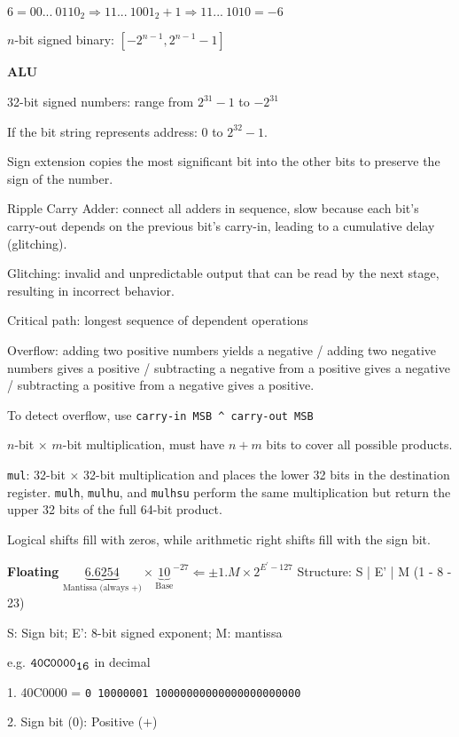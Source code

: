 \documentclass[10pt,landscape,a4paper]{article}
\begin{document}
\begin{multicols}{3}
\(6 = 00...\ 0110_2 \Rightarrow 11...\ 1001_2 + 1 \Rightarrow 11 ...\ 1010 = -6\)

\(n\)-bit signed binary: \([-2^{n-1}, 2^{n-1} - 1]\)

\textbf{ALU}

32-bit signed numbers: range from \(2^{31} - 1\) to \(-2^{31}\)

If the bit string represents address: 0 to \(2^{32} - 1\).

Sign extension copies the most significant bit into the other bits to preserve the sign of the number.

Ripple Carry Adder: connect all adders in sequence, slow because each bit's carry-out depends on the previous bit's carry-in, leading to a cumulative delay (glitching).

Glitching: invalid and unpredictable output that can be read by the next stage, resulting in incorrect behavior.

Critical path: longest sequence of dependent operations

Overflow: adding two positive numbers yields a negative / adding two negative numbers gives a positive / subtracting a negative from a positive gives a negative / subtracting a positive from a negative gives a positive.

To detect overflow, use \verb|carry-in MSB ^ carry-out MSB|

\(n\)-bit \(\times\) \(m\)-bit multiplication, must have \(n + m\) bits to cover all possible products.

\verb|mul|: 32-bit \(\times\) 32-bit multiplication and places the lower 32 bits in the destination register. \verb|mulh|, \verb|mulhu|, and \verb|mulhsu| perform the same multiplication but return the upper 32 bits of the full 64-bit product.

Logical shifts fill with zeros, while arithmetic right shifts fill with the sign bit.

\textbf{Floating}
\(
  \underbrace{6.6254}_{\text{Mantissa (always +)}} \times {\underbrace{10}_{\text{Base}}}^{-27} \Longleftarrow \pm 1.M \times 2^{E^{\prime} - 127}
\)
Structure: S | E' | M (1 - 8 - 23)

S: Sign bit; E': 8-bit signed exponent; M: mantissa 

e.g. \(\verb|40C0000|_{\verb|16|}\) in decimal

1. 40C0000 = \verb|0 10000001 10000000000000000000000|
  
2. Sign bit (0): Positive (\(+\))


\end{multicols}
\end{document}
